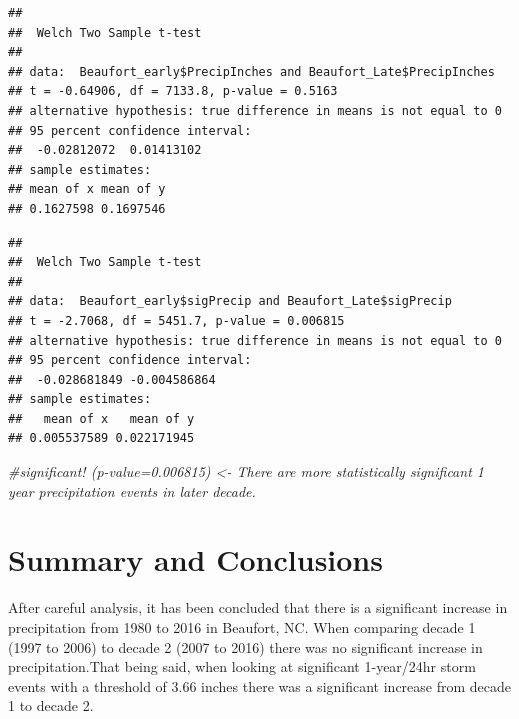 \documentclass[
  12pt,
]{article}
\newenvironment{Shaded}{\begin{snugshade}}{\end{snugshade}}
\newcommand{\CommentTok}[1]{\textcolor[rgb]{0.56,0.35,0.01}{\textit{#1}}}
\newcommand{\FunctionTok}[1]{\textcolor[rgb]{0.00,0.00,0.00}{#1}}
\newcommand{\NormalTok}[1]{#1}
\newcommand{\SpecialCharTok}[1]{\textcolor[rgb]{0.00,0.00,0.00}{#1}}
\begin{document}
\begin{verbatim}
## 
##  Welch Two Sample t-test
## 
## data:  Beaufort_early$PrecipInches and Beaufort_Late$PrecipInches
## t = -0.64906, df = 7133.8, p-value = 0.5163
## alternative hypothesis: true difference in means is not equal to 0
## 95 percent confidence interval:
##  -0.02812072  0.01413102
## sample estimates:
## mean of x mean of y 
## 0.1627598 0.1697546
\end{verbatim}

\begin{Shaded}
\end{Shaded}

\begin{verbatim}
## 
##  Welch Two Sample t-test
## 
## data:  Beaufort_early$sigPrecip and Beaufort_Late$sigPrecip
## t = -2.7068, df = 5451.7, p-value = 0.006815
## alternative hypothesis: true difference in means is not equal to 0
## 95 percent confidence interval:
##  -0.028681849 -0.004586864
## sample estimates:
##   mean of x   mean of y 
## 0.005537589 0.022171945
\end{verbatim}

\begin{Shaded}
\begin{Highlighting}[]
\CommentTok{\#significant! (p{-}value=0.006815) \textless{}{-} There are more statistically significant 1 year precipitation events in later decade. }
\end{Highlighting}
\end{Shaded}

\newpage

\hypertarget{summary-and-conclusions}{%
\section{Summary and Conclusions}\label{summary-and-conclusions}}

After careful analysis, it has been concluded that there is a
significant increase in precipitation from 1980 to 2016 in Beaufort, NC.
When comparing decade 1 (1997 to 2006) to decade 2 (2007 to 2016) there
was no significant increase in precipitation.That being said, when
looking at significant 1-year/24hr storm events with a threshold of 3.66
inches there was a significant increase from decade 1 to decade 2.
\end{document}
